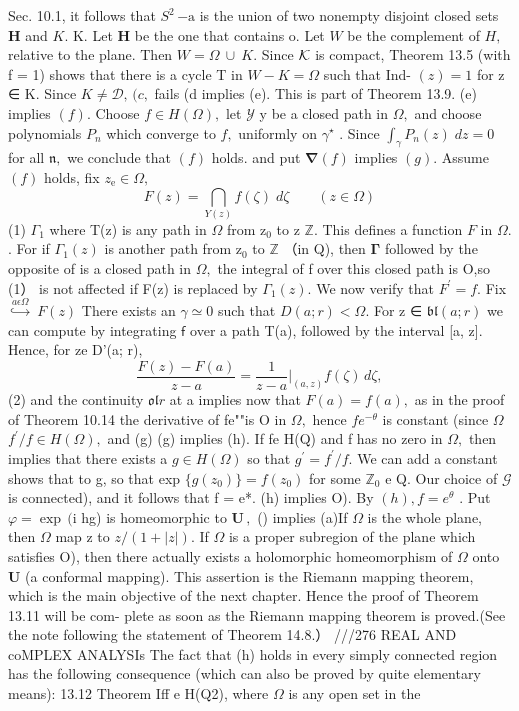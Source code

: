 Sec. 10.1, it follows that $\scriptstyle S^{2}\,{\mathrm{-a}}$ is the union of two nonempty disjoint closed sets ${\boldsymbol{H}}$ and $K.$ K. Let ${\boldsymbol{H}}$ be the one that contains o. Let $\textstyle W$ be the complement of $\textstyle H,$ relative to the plane. Then $W=\Omega~\cup~K.$ Since ${\cal K}$ is compact, Theorem 13.5 (with f = 1) shows that there is a cycle T in $W-K=\Omega$ such that Ind- $(z)=1$ for z ∈ K. Since $K\neq{\mathcal{D}},\,(c,$ fails (d implies (e). This is part of Theorem 13.9. (e) implies $(f).$ Choose $f\in H(\Omega),$ let $\scriptstyle{\mathcal{Y}}$ y be a closed path in $\Omega,$ and choose polynomials $P_{n}$ which converge to $f,$ uniformly on $\gamma^{\star}$ . Since $\textstyle\int_{\gamma}P_{n}(z)\;d z=0$ for all ${\mathfrak{n}},$ we conclude that $(f)$ holds. and put $\mathbf{\nabla}(f)$ implies $(g).$ Assume $(f)$ holds, fix $\scriptstyle z_{\mathrm{e}}\in\Omega,$ $$ F(z)=\bigcap_{Y(z)}f(\zeta)\;d\zeta\qquad(z\in\Omega) $$ (1) ${\Gamma}_{1}$ where T(z) is any path in $\Omega$ from $\mathrm{z}_{0}$ to z $\mathbb{Z}.$ This defines a function ${\mathbf{}}F$ in $\Omega.$ . For if $\Gamma_{1}(z)$ is another path from $\mathrm{z}_{0}$ to $\mathbb{Z}$ （in Q), then ${\boldsymbol{\Gamma}}$ followed by the opposite of is a closed path in $\Omega,$ the integral of f over this closed path is O,so (1） is not affected if F(z) is replaced by $\Gamma_{1}(z).$ We now verify that $F^{\prime}=f.$ Fix $\overset{a\epsilon\Omega}{\hookrightarrow}$ $F(z)$ There exists an $\scriptstyle\gamma\simeq0$ such that $D(a;r)<\Omega.$ For z ∈ ${\mathfrak{b l}}(a;r)$ we can compute by integrating $\boldsymbol{\mathsf{f}}$ over a path T(a), followed by the interval [a, z]. Hence, for ze D'(a; r), $$ {\frac{F(z)-F(a)}{z-a}}={\frac{1}{z-a}}\left.\right|_{(a,z)}f(\zeta)\,d\zeta, $$ (2) and the continuity ${\mathfrak{o l}}r$ at a implies now that $F(a)=f(a),$ as in the proof of Theorem 10.14 the derivative of fe""is O in $\Omega,$ hence $f e^{-\theta}$ is constant (since $\Omega$ $f^{\prime}/f\in H(\Omega),$ and (g) (g) implies (h). If fe H(Q) and f has no zero in $\Omega,$ then implies that there exists a $g\in H(\Omega)$ so that $g^{\prime}=f^{\prime}/f.$ We can add a constant shows that to g, so that exp $\{g(z_{0})\}=f(z_{0})$ for some $\mathbb{Z}_{0}$ e Q. Our choice of $\scriptstyle{\mathcal{G}}$ is connected), and it follows that f = e*. (h) implies O). By $(h),f=e^{\theta}$ . Put $\varphi=\exp\,(\mathrm{i}$ hg) is homeomorphic to ${\boldsymbol{U}}\,,$ () implies (a)If $\Omega$ is the whole plane, then $\Omega$ map z to $z/(1+|z|).$ If $\Omega$ is a proper subregion of the plane which satisfies O), then there actually exists a holomorphic homeomorphism of $\Omega$ onto ${\boldsymbol{U}}$ (a conformal mapping). This assertion is the Riemann mapping theorem, which is the main objective of the next chapter. Hence the proof of Theorem 13.11 will be com- plete as soon as the Riemann mapping theorem is proved.(See the note following the statement of Theorem 14.8.） ///276 REAL AND coMPLEX ANALYSIs The fact that (h) holds in every simply connected region has the following consequence (which can also be proved by quite elementary means): 13.12 Theorem Iff e H(Q2), where $\Omega$ is any open set in the 